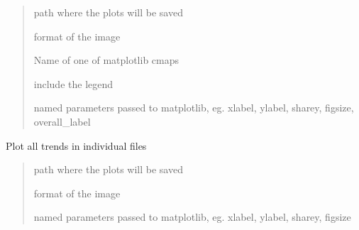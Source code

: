 \documentclass[letterpaper,10pt,english]{sphinxmanual}
\begin{document}
\begin{fulllineitems}
\begin{fulllineitems}
\begin{quote}
\begin{description}
\sphinxAtStartPar
path where the plots will be saved

\sphinxAtStartPar
format of the image

\sphinxAtStartPar
Name of one of matplotlib cmaps

\sphinxAtStartPar
include the legend

\sphinxAtStartPar
named parameters passed to matplotlib, eg. xlabel, ylabel, sharey, figsize, overall\_label

\end{description}\end{quote}

\end{fulllineitems}


\begin{fulllineitems}
\label{\detokenize{source/chowclassifier:chowclassifier.chow.ChewData.plot_individually}}
\pysigstartsignatures
{}
\pysigstopsignatures
\sphinxAtStartPar
Plot all trends in individual files
\begin{quote}\begin{description}
\sphinxAtStartPar
path where the plots will be saved

\sphinxAtStartPar
format of the image

\sphinxAtStartPar
named parameters passed to matplotlib, eg. xlabel, ylabel, sharey, figsize

\end{description}\end{quote}

\end{fulllineitems}



\end{fulllineitems}
\end{document}

